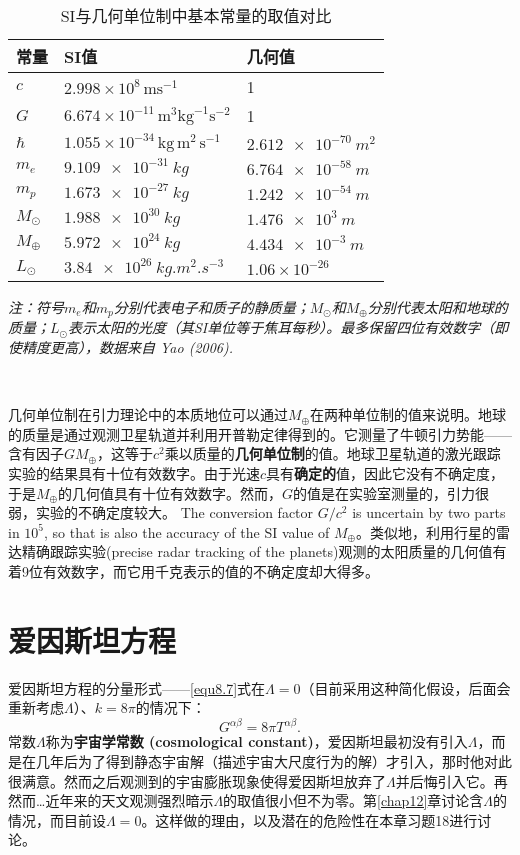 \begin{table}[h]
\centering
\begin{tabular}{l l l}
\toprule
常量 & SI值 & 几何值 \\
\midrule
$c$ & $2.998 \times 10^8\, \mathrm{ms}^{-1}$ & 1 \\
$G$ & $6.674 \times 10^{-11} \,\mathrm{m}^3 \mathrm{kg}^{-1}\mathrm{s}^{-2} $ & 1 \\
$\hbar$ & $1.055 \times 10^{-34} \,\mathrm{kg}\, \mathrm{m}^2\, \mathrm{s}^{-1} $ & $\SI{2.612e-70}{m^2}$ \\
$m_e$ & $\SI{9.109e-31}{kg} $ & $\SI{6.764e-58}{m} $ \\
$m_p$ & $\SI{1.673e-27}{kg} $ & $\SI{1.242e-54}{m} $ \\
$M_{\odot}$ & $\SI{1.988e30}{kg} $ & $\SI{1.476e3}{m} $ \\
$M_{\oplus}$ & $\SI{5.972e24}{kg} $ & $\SI{4.434e-3}{m} $ \\
$L_{\odot}$ & $\SI{3.84e26}{kg.m^{2}.s^{-3}} $ & $1.06 \times 10^{-26}$ \\
\bottomrule
\end{tabular}
\caption{SI与几何单位制中基本常量的取值对比}
\label{tab8.1}
\end{table}
\textit{注：符号$m_e$和$m_p$分别代表电子和质子的静质量；$M_{\odot}$和$M_{\oplus}$分别代表太阳和地球的质量；$L_{\odot}$表示太阳的光度（其SI单位等于焦耳每秒）。最多保留四位有效数字（即使精度更高），数据来自 Yao (2006). }

\ 

几何单位制在引力理论中的本质地位可以通过$M_{\oplus}$在两种单位制的值来说明。地球的质量是通过观测卫星轨道并利用开普勒定律得到的。它测量了牛顿引力势能——含有因子$GM_\oplus$，这等于$c^2$乘以质量的\textbf{几何单位制}的值。地球卫星轨道的激光跟踪实验的结果具有十位有效数字。由于光速$c$具有\textbf{确定的}值，因此它没有不确定度，于是$M_\oplus$的几何值具有十位有效数字。然而，$G$的值是在实验室测量的，引力很弱，实验的不确定度较大。 The conversion factor $G/c^2$ is uncertain by two parts in $10^5$, so that is
also the accuracy of the SI value of $M_\oplus$。类似地，利用行星的雷达精确跟踪实验(precise radar tracking of the planets)观测的太阳质量的几何值有着9位有效数字，而它用千克表示的值的不确定度却大得多。

\section{爱因斯坦方程}
\label{sec8.2}
爱因斯坦方程的分量形式——\eqref{equ8.7}式在$\Lambda = 0$（目前采用这种简化假设，后面会重新考虑$\Lambda$）、$k = 8\pi$的情况下：
\begin{equation}
    G^{\alpha \beta} = 8 \pi T^{\alpha \beta}.
\label{equ8.10}
\end{equation}
常数$\Lambda$称为\textbf{宇宙学常数 (cosmological constant)}，爱因斯坦最初没有引入$\Lambda$，而是在几年后为了得到静态宇宙解（描述宇宙大尺度行为的解）才引入，那时他对此很满意。然而之后观测到的宇宙膨胀现象使得爱因斯坦放弃了$\Lambda$并后悔引入它。再然而…近年来的天文观测强烈暗示$\Lambda$的取值很小但不为零。第\ref{chap12}章讨论含$\Lambda$的情况，而目前设$\Lambda = 0$。这样做的理由，以及潜在的危险性在本章习题18进行讨论。


